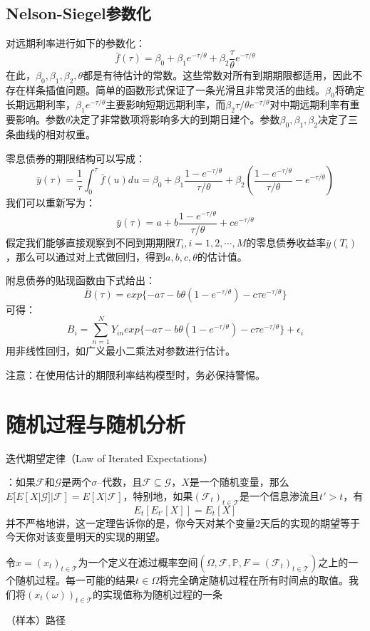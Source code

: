\documentclass[UTF8]{ctexart}
\newcommand \qd[1] {\begin{qds} {#1} \end{qds}}
\begin{document}
\subsection{Nelson-Siegel参数化}
对远期利率进行如下的参数化：
$$\bar f(\tau)=\beta_0+\beta_1 e^{-\tau/\theta} + \beta_2 \frac{\tau}{\theta} e^{-\tau/\theta}$$
在此，$\beta_0,\beta_1,\beta_2,\theta$都是有待估计的常数。这些常数对所有到期期限都适用，因此不存在样条插值问题。简单的函数形式保证了一条光滑且非常灵活的曲线。$\beta_0$将确定长期远期利率，$\beta_1 e^{-\tau/\theta}$主要影响短期远期利率，而$\beta_2 \tau/\theta e^{-\tau/\theta}$对中期远期利率有重要影响。参数$\theta$决定了非常数项将影响多大的到期日建个。参数$\beta_0,\beta_1,\beta_2$决定了三条曲线的相对权重。

零息债券的期限结构可以写成：
$$\bar y(\tau)=\frac{1}{\tau}\int_0^\tau \bar f(u)du=\beta_0+\beta_1 \frac{1-e^{-\tau/\theta}}{\tau/\theta}+\beta_2(\frac{1-e^{-\tau/\theta}}{\tau/\theta}-e^{-\tau/\theta})$$
我们可以重新写为：
$$\bar y(\tau)=a+b\frac{1-e^{-\tau/\theta}}{\tau/\theta}+ce^{-\tau/\theta}$$
假定我们能够直接观察到不同到期期限$T_i,i=1,2,\cdots,M$的零息债券收益率$\bar y(T_i)$，那么可以通过对上式做回归，得到$a,b,c,\theta$的估计值。

附息债券的贴现函数由下式给出：
$$\bar B(\tau)=exp\{-a\tau-b\theta(1-e^{-\tau/\theta})-c\tau e^{-\tau/\theta} \}$$
可得：
$$B_i=\sum\limits_{n=1}^N Y_{in}exp\{-a\tau-b\theta(1-e^{-\tau/\theta})-c\tau e^{-\tau/\theta} \}+\epsilon_i$$
用非线性回归，如广义最小二乘法对参数进行估计。

注意：在使用估计的期限利率结构模型时，务必保持警惕。

\section{随机过程与随机分析}

\qd{迭代期望定律（Law of Iterated Expectations）}：如果$\mathscr{F}$和$\mathscr{G}$是两个$\sigma$--代数，且$\mathscr{F} \subseteq \mathscr{G}$，$X$是一个随机变量，那么$E[E[X|\mathscr{G}]|\mathscr{F}]=E[X|\mathscr{F}]$，特别地，如果$(\mathscr{F}_t)_{t \in \mathscr{T}}$是一个信息渗流且$t'>t$，有$$E_t[E_{t'}[X]]=E_t[X]$$并不严格地讲，这一定理告诉你的是，你今天对某个变量2天后的实现的期望等于今天你对该变量明天的实现的期望。

令$x=(x_t)_{t \in \mathscr{T}}$为一个定义在滤过概率空间$(\Omega,\mathscr{F},\mathbb{P},F=(\mathscr{F}_t)_{t \in \mathscr{T}})$之上的一个随机过程。每一可能的结果$t \in \Omega$将完全确定随机过程在所有时间点的取值。我们将$(x_t(\omega))_{t \in \mathscr{T}}$的实现值称为随机过程的一条\qd{（样本）路径}
\end{document}

